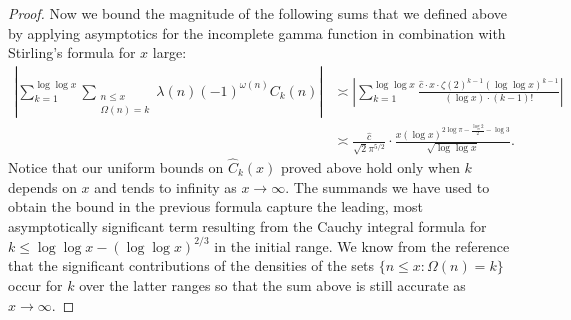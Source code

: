 \documentclass[11pt,reqno,a4letter]{article}
\numberwithin{figure}{section}
\numberwithin{table}{section}
\theoremstyle{plain}
\numberwithin{theorem}{section}
\theoremstyle{definition}
\begin{document}
\begin{proof}
Now we bound the magnitude 
of the following sums that we defined above by applying asymptotics for the 
incomplete gamma function in combination with Stirling's formula for $x$ large: 
\begin{align*} 
\left\lvert 
     \sum_{k=1}^{\log\log x} 
     \sum_{\substack{n \leq x \\ \Omega(n) = k}} \lambda(n) (-1)^{\omega(n)} 
     C_k(n) \right\rvert & \asymp \left\lvert 
     \sum_{k=1}^{\log\log x} 
     \frac{\widehat{c} \cdot 
     x \cdot \zeta(2)^{k-1} (\log\log x)^{k-1}}{(\log x) \cdot (k-1)!} \right\rvert \\ 
     & \asymp \frac{\widehat{c}}{\sqrt{2} \pi^{5/2}} \cdot 
     \frac{x (\log x)^{2\log\pi - \frac{\log 2}{2} - \log 3}}{\sqrt{\log\log x}}. 
\end{align*} 
Notice that our uniform bounds on $\widehat{C}_k(x)$ proved above hold only when $k$ 
depends on $x$ and tends to infinity as $x \rightarrow \infty$. The summands we have used to 
obtain the bound in the previous formula capture the leading, most asymptotically significant 
term resulting from the Cauchy integral formula for $k \leq \log\log x - (\log\log x)^{2/3}$ 
in the initial range. We know from the reference that the significant contributions of the 
densities of the sets $\{n \leq x: \Omega(n) = k\}$ occur for $k$ over the latter ranges so that 
the sum above is still accurate as $x \rightarrow \infty$. 
\end{proof} 
\end{document}
